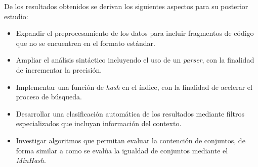 De los resultados obtenidos se derivan los siguientes aspectos para su posterior estudio:

\begin{itemize}
  \item Expandir el preprocesamiento de los datos para incluir fragmentos de código que no se encuentren en el formato estándar.
  \item Ampliar el análisis sintáctico incluyendo el uso de un \textit{parser}, con la finalidad de incrementar la precisión.
  \item Implementar una función de \textit{hash} en el índice, con la finalidad de acelerar el proceso de búsqueda.
  \item Desarrollar una clasificación automática de los resultados mediante filtros especializados que incluyan información del contexto.
  \item Investigar algoritmos que permitan evaluar la contención de conjuntos, de forma similar a como se evalúa la igualdad de conjuntos mediante el \textit{MinHash}.
\end{itemize}